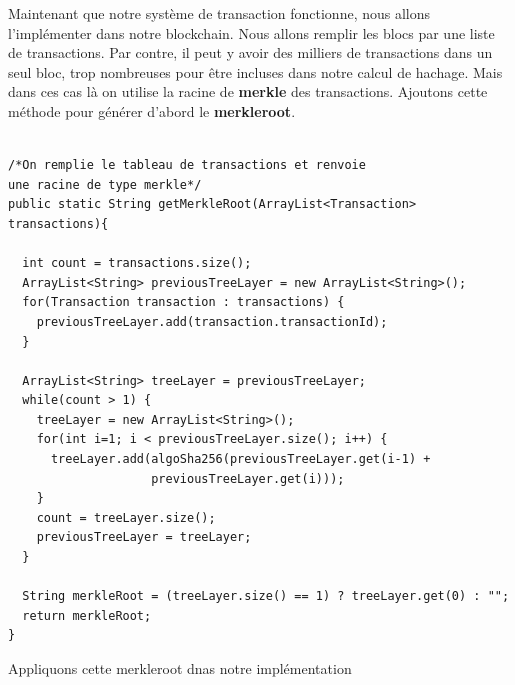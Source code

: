 \documentclass[12pt]{report}
\begin{document}
\hspace{1cm} Maintenant que notre système de transaction fonctionne, nous allons l'implémenter dans notre blockchain. Nous allons remplir les blocs par une liste de transactions. Par contre, il peut y avoir des milliers de transactions dans un seul bloc, trop nombreuses pour être incluses dans notre calcul de hachage. Mais dans ces cas là on utilise la racine de \textbf{merkle} des transactions. Ajoutons cette méthode pour générer d'abord le \textbf{merkleroot}.

\begin{lstlisting}

/*On remplie le tableau de transactions et renvoie 
une racine de type merkle*/
public static String getMerkleRoot(ArrayList<Transaction> transactions){

  int count = transactions.size();
  ArrayList<String> previousTreeLayer = new ArrayList<String>();
  for(Transaction transaction : transactions) {
    previousTreeLayer.add(transaction.transactionId);
  }
  
  ArrayList<String> treeLayer = previousTreeLayer;
  while(count > 1) {
    treeLayer = new ArrayList<String>();
    for(int i=1; i < previousTreeLayer.size(); i++) {
      treeLayer.add(algoSha256(previousTreeLayer.get(i-1) + 
                    previousTreeLayer.get(i)));
    }
    count = treeLayer.size();
    previousTreeLayer = treeLayer;
  }
  
  String merkleRoot = (treeLayer.size() == 1) ? treeLayer.get(0) : "";
  return merkleRoot;
}

\end{lstlisting}
Appliquons cette merkleroot dnas notre implémentation
\end{document}
